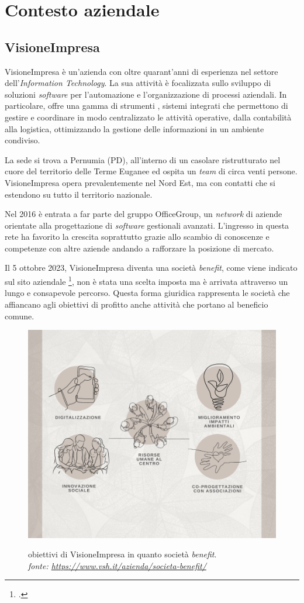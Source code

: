 \chapter{Contesto aziendale}
\label{chap:Contesto-aziendale}


\section{VisioneImpresa}

VisioneImpresa è un'azienda con oltre quarant'anni di esperienza nel settore dell'\textit{Information Technology}. La sua attività è focalizzata sullo sviluppo di soluzioni \textit{software} per l'automazione e l'organizzazione di processi aziendali. In particolare, offre una gamma di strumenti , sistemi integrati che permettono di gestire e coordinare in modo centralizzato le attività operative, dalla contabilità alla logistica, ottimizzando la gestione delle informazioni in un ambiente condiviso.

La sede si trova a Pernumia (PD), all'interno di un casolare ristrutturato nel cuore del territorio delle Terme Euganee ed ospita un \textit{team} di circa venti persone. VisioneImpresa opera prevalentemente nel Nord Est, ma con contatti che si estendono su tutto il territorio nazionale.

Nel 2016 è entrata a far parte del gruppo OfficeGroup, un \textit{network} di aziende orientate alla progettazione di \textit{software} gestionali avanzati. L'ingresso in questa rete ha favorito la crescita soprattutto grazie allo scambio di conoscenze e competenze con altre aziende andando a rafforzare la posizione di mercato.

Il 5 ottobre 2023, VisioneImpresa diventa una società \textit{benefit}, come viene indicato sul sito aziendale \footcite{site:vsh-sb}, non è stata una scelta imposta ma è arrivata attraverso un lungo e consapevole percorso.
Questa forma giuridica rappresenta le società che affiancano agli obiettivi di profitto anche attività che portano al beneficio comune. 

\begin{figure}[H]
    \centering
    \includegraphics[alt={obiettivi società \textit{benefit}}, width=.5\columnwidth]{img/Sbenefit.png}
    \caption[Obiettivi di VisioneImpresa in quanto società \textit{benefit}.]{obiettivi di VisioneImpresa in quanto società \textit{benefit}. \\ \textit{fonte: \url{https://www.vsh.it/azienda/societa-benefit/}}}
    \label{fig:Benefit}
\end{figure} 

